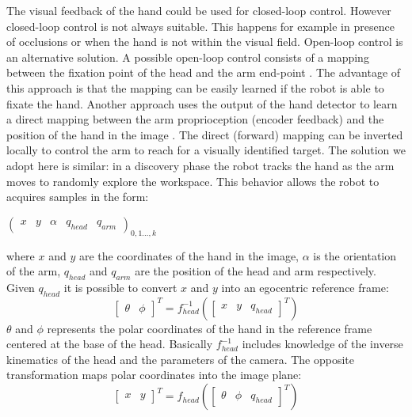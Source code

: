 The visual feedback of the hand could be used for closed-loop control.
However closed-loop control is not always suitable. This happens for example
in presence of occlusions or when the hand is not within the visual field.
%
Open-loop control is an alternative solution. A possible open-loop
control consists of a mapping between the fixation point of the
head and the arm end-point \cite{metta00Babybot}. The advantage of
this approach is that the mapping can be easily learned if the
robot is able to fixate the hand. Another approach uses the output of the 
hand detector to learn a direct mapping between the arm
proprioception (encoder feedback) and the position of the hand in
the image \cite{natale05from}. The direct (forward) mapping
can be inverted locally to control the arm to reach for a visually
identified target. The solution we adopt here is similar: in a
discovery phase the robot tracks the hand as the arm moves to
randomly explore the workspace. This behavior allows the robot to
acquires samples in the form:
%
\begin{center}
\begin{math}
  \left(\begin{array}{ccccc}
    x & y & \alpha &q_{head} &q_{arm} \end{array}\right)_{0,1\dots,k}
\end{math}
\end{center}
%
where $x$ and $y$ are the coordinates of the hand in the image,
$\alpha$ is the orientation of the arm, $q_{head}$ and $q_{arm}$ are
the position of the head and arm respectively. Given $q_{head}$ it is
possible to convert $x$ and $y$ into an egocentric reference frame:
%
\begin{equation}
  \left[
  \begin{array}{ccc}
    \theta & \phi
    \end{array}\right]^T
  = f_{head}^{-1}
  \left(\left[\begin{array}{ccc}
    x &
    y &
    q_{head}
    \end{array}\right]^T \right)
\label{eq-head-inverse}
\end{equation}
%
$\theta$ and $\phi$ represents the polar coordinates of the hand in the
reference frame centered at the base of the head. Basically
$f_{head}^{-1}$ includes knowledge of the inverse kinematics of the
head and the parameters of the camera. The opposite transformation maps
polar coordinates into the image plane:
\begin{equation}
  \left[\begin{array}{cc}
    x & y
    \end{array}\right]^T
  = f_{head}
  \left(\left[\begin{array}{ccc}
    \theta &
    \phi &
    q_{head}
    \end{array} \right]^T\right)
\label{eq-head-direct}
\end{equation}

